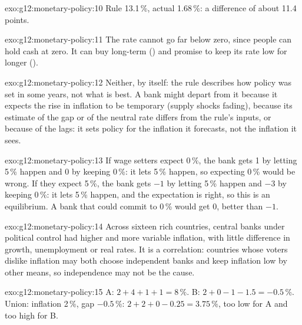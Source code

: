 \begin{solution}{exo:g12:monetary-policy:10}
Rule 13.1\,\%, actual 1.68\,\%: a difference of about 11.4 points.
\end{solution}

\begin{solution}{exo:g12:monetary-policy:11}
The rate cannot go far below zero, since people can hold cash at zero. It can buy long-term  () and promise to keep its rate low for longer
().
\end{solution}

\begin{solution}{exo:g12:monetary-policy:12}
Neither, by itself: the rule describes how policy was set in some years, not what is best. A bank might depart from it because it expects the rise in inflation to be
temporary (supply shocks fading), because its estimate of the gap or of the neutral rate differs from the rule's inputs, or because of the lags: it sets policy for
the inflation it forecasts, not the inflation it sees.
\end{solution}

\begin{solution}{exo:g12:monetary-policy:13}
If wage setters expect 0\,\%, the bank gets 1 by letting 5\,\% happen and 0 by keeping 0\,\%: it lets 5\,\% happen, so expecting 0\,\% would be wrong. If they expect 5\,\%, the
bank gets $-1$ by letting 5\,\% happen and $-3$ by keeping 0\,\%: it lets 5\,\% happen, and the expectation is right, so this is an equilibrium. A bank that could commit
to 0\,\% would get 0, better than $-1$.
\end{solution}

\begin{solution}{exo:g12:monetary-policy:14}
Across sixteen rich countries, central banks under political control had higher and more variable inflation, with little difference in growth, unemployment or real
rates. It is a correlation: countries whose voters dislike inflation may both choose independent banks and keep inflation low by other means, so independence may not
be the cause.
\end{solution}

\begin{solution}{exo:g12:monetary-policy:15}
A: $2 + 4 + 1 + 1 = 8\,\%$. B: $2 + 0 - 1 - 1.5 = -0.5\,\%$. Union: inflation 2\,\%, gap $-0.5\,\%$: $2 + 2 + 0 - 0.25 = 3.75\,\%$, too low for A and too high for B.
\end{solution}

